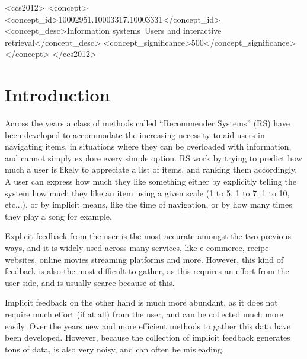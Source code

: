 \documentclass[sigconf,nonacm]{acmart}
\begin{document}
\begin{CCSXML}
  <ccs2012>
  <concept>
  <concept_id>10002951.10003317.10003331</concept_id>
  <concept_desc>Information systems~Users and interactive retrieval</concept_desc>
  <concept_significance>500</concept_significance>
  </concept>
  </ccs2012>
\end{CCSXML}



\maketitle

\section{Introduction}

Across the years a class of methods called ``Recommender Systems'' (RS) have been
developed to accommodate the increasing necessity to aid users in navigating items,
in situations where they can be overloaded with information, and cannot simply
explore every simple option.
RS work by trying to predict how much a user is likely to appreciate a list of items,
and ranking them accordingly. A user can express how much they like something either
by explicitly telling the system how much they like an item using a given scale (1 to 5,
1 to 7, 1 to 10, etc...), or by implicit means, like the time of navigation,
or by how many times they play a song for example.

Explicit feedback from the user is the most accurate amongst the two previous ways,
and it is widely used across many services, like e-commerce, recipe
websites, online movies streaming platforms and more. However, this kind of feedback
is also the most difficult to gather, as this requires an effort from the user side,
and is usually scarce because of this.

Implicit feedback on the other hand is much more abundant, as it does not require much
effort (if at all) from the user, and can be collected much more easily.
Over the years new and more efficient methods to gather this data have been
developed. However, because the collection of implicit feedback generates tons
of data, is also very noisy, and can often be misleading.
\end{document}
